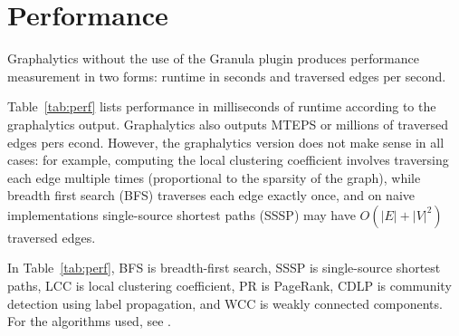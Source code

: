 \documentclass[11pt]{article}
\begin{document}
\section{Performance}
Graphalytics without the use of the Granula plugin produces performance measurement in two forms: runtime in seconds and traversed edges per second.

Table~\ref{tab:perf} lists performance in milliseconds of runtime according to the graphalytics output. Graphalytics also outputs MTEPS or millions of traversed edges pers econd. However, the graphalytics version does not make sense in all cases: for example, computing the local clustering coefficient involves traversing each edge multiple times (proportional to the sparsity of the graph), while breadth first search (BFS) traverses each edge exactly once, and on na\:ive implementations single-source shortest paths (SSSP) may have $O(|E| + |V|^2)$ traversed edges.

In Table~\ref{tab:perf}, BFS is breadth-first search, SSSP is single-source shortest paths, LCC is local clustering coefficient, PR is PageRank, CDLP is community detection using label propagation, and WCC is weakly connected components. For the algorithms used, see \cite{Iosup:2016:Graphalyticstech}.

\begin{table}[!htb]
	\centering

		\centering
	\caption{Performance Results for the \texttt{dota-league} dataset with 61,670 vertices and 50,870,313 edges.}
	\label{tab:perf}
\end{table}
\end{document}
